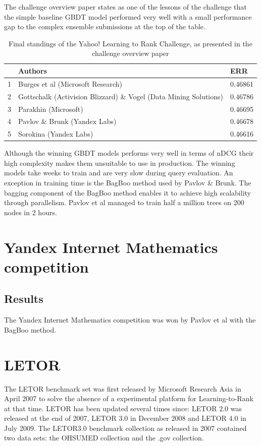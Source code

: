 The challenge overview paper states as one of the lessons of the challenge that the simple baseline \ac{GBDT} model performed very well with a small performance gap to the complex ensemble submissions at the top of the table.\\

\begin{table}
\begin{tabular}{l|p{6.3cm}|l}
 & Authors & ERR \\
 \hline 
1 & Burges et al (Microsoft Research) & 0.46861 \\ 
2 & Gottschalk (Activision Blizzard) \& Vogel (Data Mining Solutions) & 0.46786 \\ 
3 & Parakhin (Microsoft) & 0.46695 \\ 
4 & Pavlov \& Brunk (Yandex Labs) & 0.46678 \\ 
5 & Sorokina (Yandex Labs) & 0.46616 \\ 
\end{tabular}
\caption{Final standings of the Yahoo! Learning to Rank Challenge, as presented in the challenge overview paper \cite{Chapelle2011a}}
\label{fig:yahoo_results}
\end{table}

Although the winning \ac{GBDT} models performs very well in terms of \ac{nDCG} their high complexity makes them unsuitable to use in production. The winning models take weeks to train and are very slow during query evaluation. An exception in training time is the BagBoo \cite{Pavlov2010} method used by Pavlov \& Brunk. The bagging component of the BagBoo method enables it to achieve high scalability through parallelism. Pavlov et al \cite{Pavlov2010} managed to train half a million trees on 200 nodes in 2 hours.
\chapter{Yandex Internet Mathematics competition}

\section{Results}
The Yandex Internet Mathematics competition was won by Pavlov et al \cite{Pavlov2010} with the BagBoo method.


\chapter{LETOR}
The LETOR benchmark set was first released by Microsoft Research Asia in April 2007 to solve the absence of a experimental platform for Learning-to-Rank at that time. LETOR has been updated several times since: LETOR 2.0 was released at the end of 2007, LETOR 3.0 in December 2008 and LETOR 4.0 in July 2009. The LETOR3.0 benchmark collection \cite{Liu2007b} as released in 2007 contained two data sets: the OHSUMED collection and the .gov collection.\\

